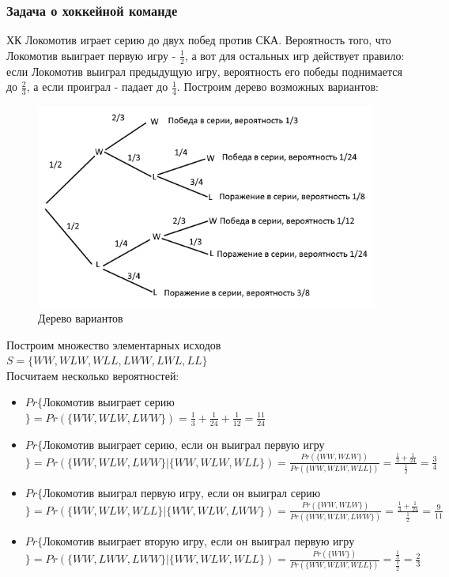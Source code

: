 \subsubsection{Задача о хоккейной команде}
ХК Локомотив играет серию до двух побед против СКА. Вероятность того, что Локомотив выиграет первую игру - $\frac{1}{2}$, а вот для остальных игр действует правило: если Локомотив выиграл предыдущую игру, вероятность его победы поднимается до $\frac{2}{3}$, а если проиграл - падает до $\frac{1}{4}$. Построим дерево возможных вариантов:\\
\begin{figure}
\includegraphics[width=\linewidth]{Hockey.png}
\caption{Дерево вариантов}
\label{fig:Hockey}
\end{figure}
Построим множество элементарных исходов $S = \{WW, WLW, WLL, LWW, LWL, LL\}$\\
Посчитаем несколько вероятностей:\\
\begin{itemize}
\item $Pr\{$Локомотив выиграет серию$\} = Pr(\{WW, WLW, LWW\}) = \frac{1}{3} + \frac{1}{24} + \frac{1}{12} = \frac{11}{24}$\\
\item $Pr\{$Локомотив выиграет серию, если он выиграл первую игру$\} = Pr(\{WW, WLW, LWW\}|\{WW, WLW, WLL\}) = \frac{Pr(\{WW, WLW\})}{Pr(\{WW, WLW, WLL\})} = \frac{\frac{1}{3} + \frac{1}{24}}{\frac{1}{2}} = \frac{3}{4}$\\
\item $Pr\{$Локомотив выиграл первую игру, если он выиграл серию$\} = Pr(\{WW, WLW, WLL\}|\{WW, WLW, LWW\}) = \frac{Pr(\{WW, WLW\})}{Pr(\{WW, WLW, LWW\})} = \frac{\frac{1}{3} + \frac{1}{24}}{\frac{1}{2}} = \frac{9}{11}$\\
\item $Pr\{$Локомотив выиграет вторую игру, если он выиграл первую игру$\} = Pr(\{WW, LWW, LWW\}|\{WW, WLW, WLL\}) = \frac{Pr(\{WW\})}{Pr(\{WW, WLW, WLL\})} = \frac{\frac{1}{3}}{\frac{1}{2}} = \frac{2}{3}$
\end{itemize}